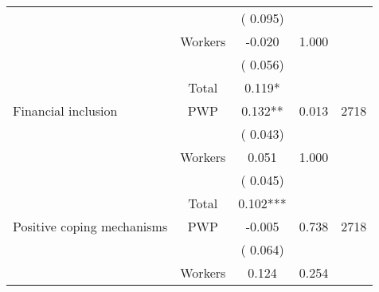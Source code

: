 \begin{tabular}{l*{4}{c}}
                               &                               &       (       0.095)                              & &                                                                             \\ 
                               &       Workers         &             -0.020                 &        1.000    &                                               \\ 
                               &                               &       (       0.056)                              & &                                                                             \\ 
\cmidrule{2-3}
                               &       Total           &              0.119*                 &    &                                               \\ 
\cmidrule{2-3}
 Financial inclusion                 &       PWP     &              0.132**                 &        0.013    & 2718                               \\ 
                               &                               &       (       0.043)                              & &                                                                             \\ 
                               &       Workers         &              0.051                 &        1.000    &                                               \\ 
                               &                               &       (       0.045)                              & &                                                                             \\ 
\cmidrule{2-3}
                               &       Total           &              0.102***                 &    &                                               \\ 
\cmidrule{2-3}
 Positive coping mechanisms                 &       PWP     &             -0.005                 &        0.738    & 2718                               \\ 
                               &                               &       (       0.064)                              & &                                                                             \\ 
                               &       Workers         &              0.124               &        0.254   &                                               \\ 

\end{tabular}
